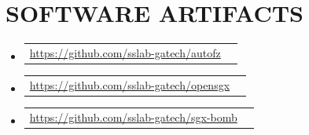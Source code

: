 \documentclass[letterpaper,11pt]{article}
\makeatletter
\newcommand{\softwareArtifactHeading}[2]{
    \item[]
    \begin{tabular*}{1.00\textwidth}{l@{\extracolsep{\fill}}r}
      \hspace{0em}\small#1 & \small #2  \\
    \end{tabular*}\vspace{-7pt}
}
\newcommand{\resumeSubHeadingListStart}{\begin{itemize}[leftmargin=0.0in, label={}, itemsep=4pt, topsep=2pt]}
\newcommand{\resumeSubHeadingListEnd}{\end{itemize}}
\makeatother
\begin{document}
\section{SOFTWARE ARTIFACTS}
\resumeSubHeadingListStart
    \softwareArtifactHeading
    {\makebox[2.2cm][l]{\textbf{Autofz:}} {\href{https://github.com/sslab-gatech/autofz}{\faGithub  \hspace{0.1em} https://github.com/sslab-gatech/autofz}}} 
    {\makebox[1.0cm][l]{\faCodeFork 13} \makebox[1.0cm][l]{\faStar 85}}
    \softwareArtifactHeading
    {\makebox[2.2cm][l]{\textbf{OpenSGX:}} {\href{https://github.com/sslab-gatech/opensgx}{\faGithub  \hspace{0.1em} https://github.com/sslab-gatech/opensgx}}}
    {\makebox[1.0cm][l]{\faCodeFork 82} \makebox[1.0cm][l]{\faStar 308}}
     \softwareArtifactHeading
    {\makebox[2.2cm][l]{\textbf{SGXBomb:}} {\href{https://github.com/sslab-gatech/sgx-bomb}{\faGithub  \hspace{0.1em} https://github.com/sslab-gatech/sgx-bomb}}}
    {\makebox[1.0cm][l]{\faCodeFork 4} \makebox[1.0cm][l]{\faStar 18}}
\resumeSubHeadingListEnd
\vspace{7pt}
\end{document}
